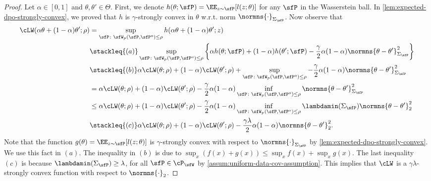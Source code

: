 \begin{proof}
    Let $\alpha\in[0,1]$ and $\theta,\theta'\in\Theta$. First, we denote $h(\theta;\sfP)=\EE_{z\sim\sfP}[l(z;\theta)]$ for any $\sfP$ in the Wasserstein ball. In \cref{lem:expected-dpo-strongly-convex}, we proved that $h$ is $\gamma$-strongly convex in $\theta$ w.r.t. norm $\normns{\cdot}_{\Sigma_{\sfP}}$. Now observe that
    \begin{align*}
        \cLW(\alpha\theta+(1-\alpha)\theta';\rho) &= \sup_{\sfP\colon\sfW_p(\sfP,\sfP^o)\leq\rho} h(\alpha\theta+(1-\alpha)\theta';z)\\
        &\stackleq{(a)} \sup_{\sfP\colon\sfW_p(\sfP,\sfP^o)\leq\rho} \bigg\{  \alpha h(\theta;\sfP) + (1-\alpha)h(\theta';\sfP) -\frac{\gamma}{2}\alpha(1-\alpha)\normns{\theta-\theta'}^2_{\Sigma_\sfP} \bigg\} \\
        &\stackleq{(b)} \alpha\cLW(\theta;\rho) + (1-\alpha)\cLW(\theta';\rho) + \sup_{\sfP\colon\sfW_p(\sfP,\sfP^o)\leq\rho}-\frac{\gamma}{2}\alpha(1-\alpha)\normns{\theta-\theta'}^2_{\Sigma_{\sfP}}\\
        &= \alpha\cLW(\theta;\rho) + (1-\alpha)\cLW(\theta';\rho) - \frac{\gamma}{2}\alpha(1-\alpha)\inf_{\sfP\colon\sfW_p(\sfP,\sfP^o)\leq\rho}\normns{\theta-\theta'}^2_{\Sigma_{\sfP}} \\
        &\leq \alpha\cLW(\theta;\rho) + (1-\alpha)\cLW(\theta';\rho) - \frac{\gamma}{2}\alpha(1-\alpha)\inf_{\sfP\colon\sfW_p(\sfP,\sfP^o)\leq\rho}\lambdamin(\Sigma_{\sfP})\normns{\theta-\theta'}^2_2 \\
        &\stackleq{(c)} \alpha\cLW(\theta;\rho) + (1-\alpha)\cLW(\theta';\rho)- \frac{\gamma\lambda}{2}\alpha(1-\alpha)\normns{\theta-\theta'}^2_2.
    \end{align*}
    Note that the function $g(\theta)=\EE_{z\sim\sfP}[l(z;\theta)]$ is $\gamma$-strongly convex with respect to $\normns{\cdot}_{\Sigma_\sfP}$ by \cref{lem:expected-dpo-strongly-convex}. We use this fact in $(a)$. The inequality in $(b)$ is due to $\sup_x (f(x)+g(x))\leq \sup_x f(x) + \sup_x g(x)$. The last inequality $(c)$ is because $\lambdamin(\Sigma_{\sfP}) \geq \lambda$, for all $\sfP\in\cP_{\sfW}$ by \cref{assum:uniform-data-cov-assumption}. This implies that $\cLW$ is a $\gamma\lambda$-strongly convex function with respect to $\normns{\cdot}_2$.
\end{proof}

